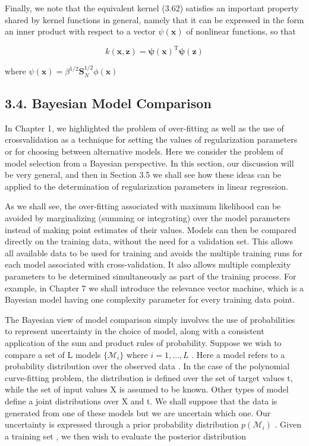 \documentclass[
  10
]{article}
\begin{document}
Finally, we note that the equivalent kernel (3.62) satisfies an
important property shared by kernel functions in general, namely that it
can be expressed in the form an inner product with respect to a vector
\(\psi ( \mathbf { x } )\) of nonlinear functions, so that

\[
k (\mathbf {x}, \mathbf {z}) = \boldsymbol {\psi} (\mathbf {x}) ^ {\mathrm{T}} \boldsymbol {\psi} (\mathbf {z})\tag{3.65}
\]

where
\(\psi ( \mathbf { x } ) = \beta ^ { 1 / 2 } \mathbf { S } _ { N } ^ { 1 / 2 } \phi ( \mathbf { x } )\)

\subsection{3.4. Bayesian Model
Comparison}\label{bayesian-model-comparison}

In Chapter 1, we highlighted the problem of over-fitting as well as the
use of crossvalidation as a technique for setting the values of
regularization parameters or for choosing between alternative models.
Here we consider the problem of model selection from a Bayesian
perspective. In this section, our discussion will be very general, and
then in Section 3.5 we shall see how these ideas can be applied to the
determination of regularization parameters in linear regression.

As we shall see, the over-fitting associated with maximum likelihood can
be avoided by marginalizing (summing or integrating) over the model
parameters instead of making point estimates of their values. Models can
then be compared directly on the training data, without the need for a
validation set. This allows all available data to be used for training
and avoids the multiple training runs for each model associated with
cross-validation. It also allows multiple complexity parameters to be
determined simultaneously as part of the training process. For example,
in Chapter 7 we shall introduce the relevance vector machine, which is a
Bayesian model having one complexity parameter for every training data
point.

The Bayesian view of model comparison simply involves the use of
probabilities to represent uncertainty in the choice of model, along
with a consistent application of the sum and product rules of
probability. Suppose we wish to compare a set of L models
\(\{ \mathcal { M } _ { i } \}\) where \(i = 1 , \ldots , L\) . Here a
model refers to a probability distribution over the observed data . In
the case of the polynomial curve-fitting problem, the distribution is
defined over the set of target values t, while the set of input values X
is assumed to be known. Other types of model define a joint
distributions over X and t. We shall suppose that the data is generated
from one of these models but we are uncertain which one. Our uncertainty
is expressed through a prior probability distribution
\(p ( \mathcal { M } _ { i } )\) . Given a training set , we then wish
to evaluate the posterior distribution
\end{document}
